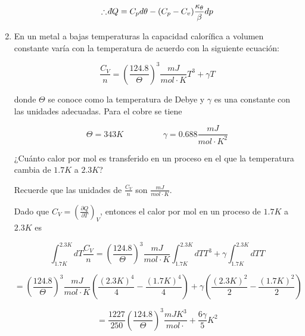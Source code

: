 \documentclass[12pt,a4paper]{article}
\newcommand{\dbar}{\mathchar'26\mkern-12mu d}
\begin{document}
\begin{enumerate}
    \begin{equation*}
        \therefore  \dbar Q = C_p d\theta  -(C_p - C_v) \frac{\kappa_\theta}{\beta} dp
    \end{equation*}
    
    
    
    
    
    
    \item En un metal a bajas temperaturas la capacidad calorífica a volumen constante varía con la temperatura de acuerdo con la siguiente ecuación:
    
    \begin{equation*}
        \frac{C_V}{n} = \left(\frac{124.8}{\Theta}\right)^3 \frac{mJ}{mol \cdot K} T^3 + \gamma T
    \end{equation*}
    
    donde $\Theta$ se conoce como la temperatura de Debye y $\gamma$ es una constante con las unidades adecuadas. Para el cobre se tiene
    
    \begin{equation*}
        \Theta = 343 K \hspace{2cm} \gamma = 0.688 \frac{mJ}{mol \cdot K^2}
    \end{equation*}
    
    ¿Cuánto calor por mol es transferido en un proceso en el que la temperatura cambia de $1.7 K$ a $2.3 K$?
    
    Recuerde que las unidades de $\frac{C_V}{n}$ son $\frac{mJ}{mol \cdot K}$.
    
    Dado que $C_V=\left(\frac{\partial Q}{\partial T}\right)_V$, entonces el calor por mol en un proceso de $1.7 K$ a $2.3 K$ es 
    
    \begin{equation*}
        \int_{1.7K}^{2.3K} dT \frac{C_V}{n}= \left(\frac{124.8}{\Theta}\right)^3 \frac{mJ}{mol \cdot K} \int_{1.7K}^{2.3K} dT    T^3 + \gamma \int_{1.7K}^{2.3K} dT  T
    \end{equation*}
    
    \begin{equation*}
        = \left(\frac{124.8}{\Theta}\right)^3 \frac{mJ}{mol \cdot K} \left(\frac{(2.3K)^4}{4} - \frac{(1.7K)^4}{4}\right) + \gamma \left(\frac{(2.3K)^{2}}{2} - \frac{(1.7K)^{2}}{2} \right)
    \end{equation*}
    
    \begin{equation*}
        =\frac{1227}{250} \left(\frac{124.8}{\Theta}\right)^3 \frac{mJ K^3}{mol \cdot}  +  \frac{6\gamma}{5} K^2
    \end{equation*}
    

\end{enumerate}
\end{document}
